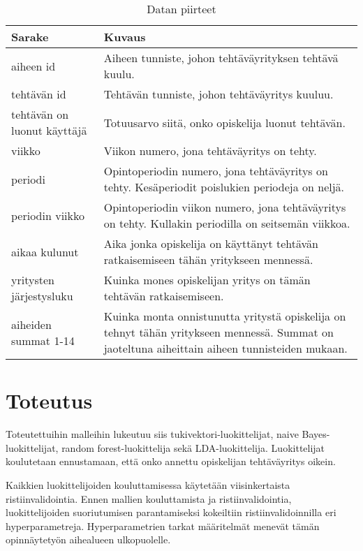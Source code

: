 \documentclass[finnish,twoside,openright]{HYgraduMLDS}
\begin{document}
\begin{table}
    \centering
    \begin{tabular}{|| m{4cm} | m{10cm} ||} 
        \hline
        Sarake & Kuvaus \\ [0.5ex] 
        \hline\hline
        aiheen id                   & Aiheen tunniste, johon tehtäväyrityksen tehtävä kuulu. \\
        \hline
        tehtävän id                 & Tehtävän tunniste, johon tehtäväyritys kuuluu. \\
        \hline
        tehtävän on luonut käyttäjä & Totuusarvo siitä, onko opiskelija luonut tehtävän. \\
        \hline
        viikko                      & Viikon numero, jona tehtäväyritys on tehty. \\
        \hline
        periodi                     & Opintoperiodin numero, jona tehtäväyritys on tehty. Kesäperiodit poislukien periodeja on neljä. \\
        \hline
        periodin viikko             & Opintoperiodin viikon numero, jona tehtäväyritys on tehty. Kullakin periodilla on seitsemän viikkoa. \\
        \hline
        aikaa kulunut               & Aika jonka opiskelija on käyttänyt tehtävän ratkaisemiseen tähän yritykseen mennessä. \\
        \hline
        yritysten järjestysluku     & Kuinka mones opiskelijan yritys on tämän tehtävän ratkaisemiseen. \\
        \hline
        aiheiden summat 1-14        & Kuinka monta onnistunutta yritystä opiskelija on tehnyt tähän yritykseen mennessä. Summat on jaoteltuna aiheittain aiheen tunnisteiden mukaan. \\
        \hline
    \end{tabular}
    \caption{Datan piirteet}
    \label{table:columns}
\end{table}


\section{Toteutus}

Toteutettuihin malleihin lukeutuu siis tukivektori-luokittelijat, naive Bayes-luokittelijat, random forest-luokittelija sekä LDA-luokittelija. Luokittelijat koulutetaan ennustamaan, että onko annettu opiskelijan tehtäväyritys oikein.  

Kaikkien luokittelijoiden kouluttamisessa käytetään viisinkertaista ristiinvalidointia. Ennen mallien kouluttamista ja ristiinvalidointia, luokittelijoiden suoriutumisen parantamiseksi kokeiltiin ristiinvalidoinnilla eri hyperparametreja. Hyperparametrien tarkat määritelmät menevät tämän opinnäytetyön aihealueen ulkopuolelle.
\end{document}
